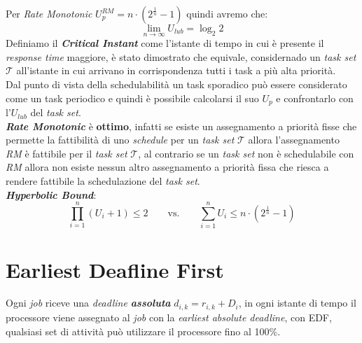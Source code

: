 Per \textit{Rate Monotonic} $U_p^{RM} = n \cdot (2^{\frac{1}{n}} - 1)$ quindi avremo che: \[ \lim_{n\to\infty} U_{lub} = \log_2 2\]
Definiamo il \textbf{\textit{Critical Instant}} come l'istante di tempo in cui è presente il \textit{response time} maggiore, è stato dimostrato che equivale, considernado un \textit{task set} $\mathcal{T}$ all'istante in cui arrivano in corrispondenza tutti i task a più alta priorità. \\
Dal punto di vista della schedulabilità un task sporadico può essere considerato come un task periodico e quindi è possibile calcolarsi il suo $U_p$ e confrontarlo con l'$U_{lub}$ del \textit{task set}. \\
\textbf{\textit{Rate Monotonic}} è \textbf{ottimo}, infatti se esiste un assegnamento a priorità fisse che permette la fattibilità di uno \textit{schedule} per un \textit{task set} $\mathcal{T}$ allora l'assegnamento \textit{RM} è fattibile per il \textit{task set} $\mathcal{T}$, al contrario se un \textit{task set} non è schedulabile con \textit{RM} allora non esiste nessun altro assegnamento a priorità fissa che riesca a rendere fattibile la schedulazione del \textit{task set}. \\
\textbf{\textit{Hyperbolic Bound}}: \[ \prod_{i=1}^n (U_i + 1) \leq 2 \qquad \text{vs.} \qquad \sum_{i=1}^n U_i \leq n \cdot (2^{\frac{1}{n}} - 1)\]

\section{Earliest Deafline First}
Ogni \textit{job} riceve una \textit{deadline \textbf{assoluta}} $d_{i,k} = r_{i,k} + D_i$, in ogni istante di tempo il processore viene assegnato al \textit{job} con la \textit{earliest absolute deadline}, con EDF, qualsiasi set di attività può utilizzare il processore fino al 100\%.